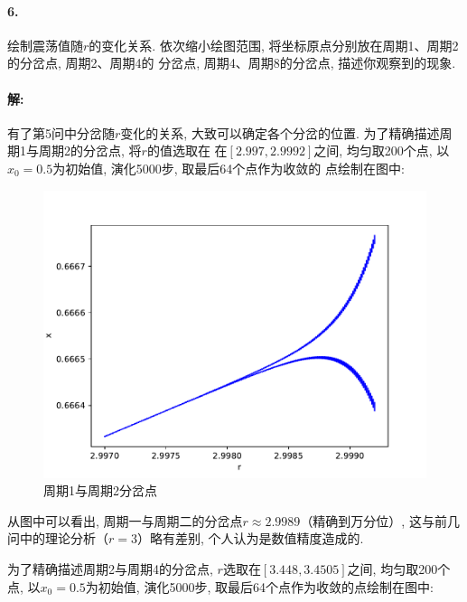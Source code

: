 \documentclass[a4paper,zihao=5,UTF8]{ctexart}
\begin{document}
    \paragraph{6.}
    绘制震荡值随$r$的变化关系. 依次缩小绘图范围, 将坐标原点分别放在周期1、周期2的分岔点, 周期2、周期4的
    分岔点, 周期4、周期8的分岔点, 描述你观察到的现象.
    \paragraph{解:}
    有了第5问中分岔随$r$变化的关系, 大致可以确定各个分岔的位置. 为了精确描述周期1与周期2的分岔点, 将$r$的值选取在
    在$[2.997,2.9992]$之间, 均匀取200个点, 以$x_0 = 0.5$为初始值, 演化5000步, 取最后64个点作为收敛的
    点绘制在图中:
    \begin{figure}[htbp]
        \centering
        \includegraphics[scale=0.5]{6_1.pdf}
        \caption{周期1与周期2分岔点}
    \end{figure}
    \par 
    从图中可以看出, 周期一与周期二的分岔点$r\approx 2.9989$（精确到万分位）, 这与前几问中的理论分析（$r=3$）略有差别, 个人认为是数值精度造成的.
    \par 
    为了精确描述周期2与周期4的分岔点, $r$选取在$[3.448, 3.4505]$之间, 均匀取200个点, 以$x_0 = 0.5$为初始值,
    演化5000步, 取最后64个点作为收敛的点绘制在图中:
\end{document}

